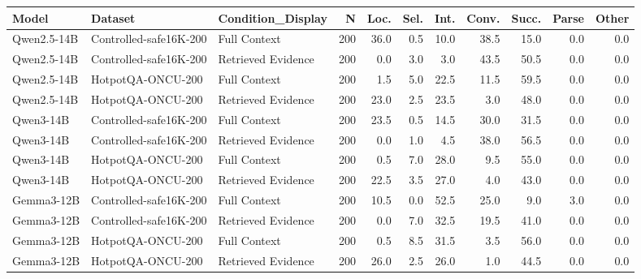 \begin{tabular}{lllrrrrrrrr}
\toprule
Model & Dataset & Condition_Display & N & Loc. & Sel. & Int. & Conv. & Succ. & Parse & Other \\
\midrule
Qwen2.5-14B & Controlled-safe16K-200 & Full Context & 200 & 36.0 & 0.5 & 10.0 & 38.5 & 15.0 & 0.0 & 0.0 \\
Qwen2.5-14B & Controlled-safe16K-200 & Retrieved Evidence & 200 & 0.0 & 3.0 & 3.0 & 43.5 & 50.5 & 0.0 & 0.0 \\
Qwen2.5-14B & HotpotQA-ONCU-200 & Full Context & 200 & 1.5 & 5.0 & 22.5 & 11.5 & 59.5 & 0.0 & 0.0 \\
Qwen2.5-14B & HotpotQA-ONCU-200 & Retrieved Evidence & 200 & 23.0 & 2.5 & 23.5 & 3.0 & 48.0 & 0.0 & 0.0 \\
Qwen3-14B & Controlled-safe16K-200 & Full Context & 200 & 23.5 & 0.5 & 14.5 & 30.0 & 31.5 & 0.0 & 0.0 \\
Qwen3-14B & Controlled-safe16K-200 & Retrieved Evidence & 200 & 0.0 & 1.0 & 4.5 & 38.0 & 56.5 & 0.0 & 0.0 \\
Qwen3-14B & HotpotQA-ONCU-200 & Full Context & 200 & 0.5 & 7.0 & 28.0 & 9.5 & 55.0 & 0.0 & 0.0 \\
Qwen3-14B & HotpotQA-ONCU-200 & Retrieved Evidence & 200 & 22.5 & 3.5 & 27.0 & 4.0 & 43.0 & 0.0 & 0.0 \\
Gemma3-12B & Controlled-safe16K-200 & Full Context & 200 & 10.5 & 0.0 & 52.5 & 25.0 & 9.0 & 3.0 & 0.0 \\
Gemma3-12B & Controlled-safe16K-200 & Retrieved Evidence & 200 & 0.0 & 7.0 & 32.5 & 19.5 & 41.0 & 0.0 & 0.0 \\
Gemma3-12B & HotpotQA-ONCU-200 & Full Context & 200 & 0.5 & 8.5 & 31.5 & 3.5 & 56.0 & 0.0 & 0.0 \\
Gemma3-12B & HotpotQA-ONCU-200 & Retrieved Evidence & 200 & 26.0 & 2.5 & 26.0 & 1.0 & 44.5 & 0.0 & 0.0 \\
\bottomrule
\end{tabular}
